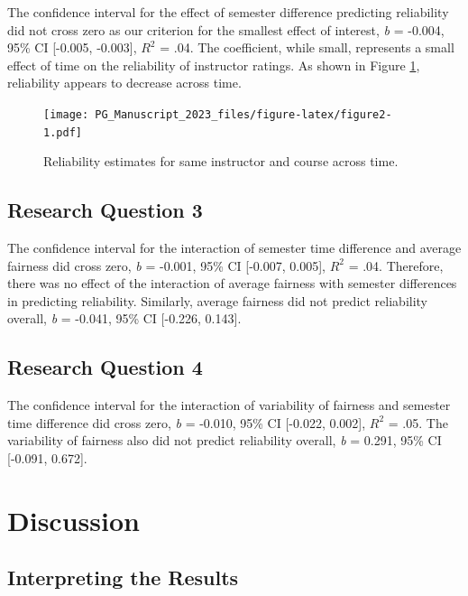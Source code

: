 \documentclass[
  man]{apa7}
\begin{document}
The confidence interval for the effect of semester difference predicting
reliability did not cross zero as our criterion for the smallest effect
of interest, \emph{b} = -0.004, 95\% CI
{[}-0.005,
-0.003{]}, \(R^2\) =
.04.
The coefficient, while small, represents a small effect of time on the
reliability of instructor ratings. As shown in Figure
\ref{fig:figure2}, reliability appears to decrease across time.

\begin{figure}
\centering
\texttt{[image: PG\_Manuscript\_2023\_files/figure-latex/figure2-1.pdf]}
\caption{\label{fig:figure2}Reliability estimates for same instructor and course across time.}
\end{figure}

\subsection{Research Question 3}\label{research-question-3-1}

The confidence interval for the interaction of semester time difference
and average fairness did cross zero, \emph{b} =
-0.001, 95\% CI
{[}-0.007,
0.005{]}, \(R^2\) =
.04.
Therefore, there was no effect of the interaction of average fairness
with semester differences in predicting reliability. Similarly, average
fairness did not predict reliability overall, \emph{b} =
-0.041, 95\% CI
{[}-0.226,
0.143{]}.

\subsection{Research Question 4}\label{research-question-4-1}

The confidence interval for the interaction of variability of fairness
and semester time difference did cross zero, \emph{b} =
-0.010, 95\% CI
{[}-0.022,
0.002{]}, \(R^2\) =
.05.
The variability of fairness also did not predict reliability overall,
\emph{b} = 0.291, 95\% CI
{[}-0.091,
0.672{]}.

\section{Discussion}\label{discussion}

\subsection{Interpreting the Results}\label{interpreting-the-results}
\end{document}
